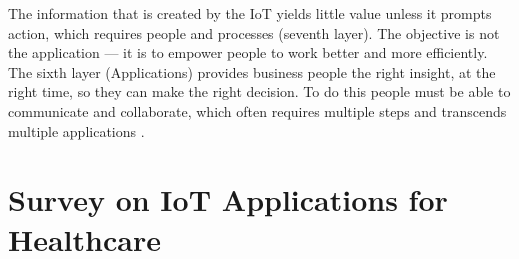 

The information that is created by the \acs{IoT} yields little value unless it prompts action, which requires people and processes (seventh layer). The objective is not the application — it is to empower people to work better and more efficiently. The sixth layer (Applications) provides business people the right insight, at the right time, so they can make the right decision. To do this people must be able to communicate and collaborate, which often requires multiple steps and transcends multiple applications \cite{Cisco2014}.

\section{Survey on \acs{IoT} Applications for Healthcare}
\label{sec:sim-approaches}




